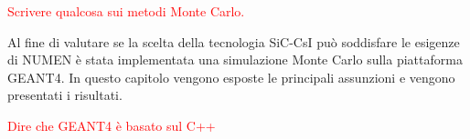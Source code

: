 

\textcolor{red}{Scrivere qualcosa sui metodi Monte Carlo.}

Al fine di valutare se la scelta della tecnologia SiC-CsI può soddisfare le esigenze di NUMEN è stata implementata una simulazione Monte Carlo sulla piattaforma GEANT4.
In questo capitolo vengono esposte le principali assunzioni e vengono presentati i risultati.

\textcolor{red}{Dire che GEANT4 è basato sul C++}

\section{}

